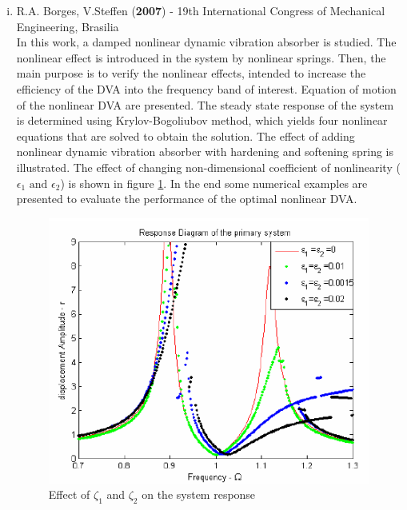 \begin{enumerate}[i)]
\item {R.A. Borges, V.Steffen (\textbf{2007}) - 19th International Congress of Mechanical Engineering, Brasilia}\\
In this work, a damped nonlinear dynamic
vibration absorber is studied. The nonlinear effect is introduced in the system by nonlinear springs. Then, the main purpose is to verify the nonlinear effects, intended to increase the efficiency of the DVA into the frequency band of interest. Equation of motion of the nonlinear DVA are presented. The steady state response of the system is determined using Krylov-Bogoliubov method, which yields four nonlinear equations that are solved to obtain the solution. The effect of adding nonlinear dynamic vibration absorber with hardening and softening spring is illustrated. The effect of changing non-dimensional coefficient of nonlinearity ($\epsilon_1 \text{ and } \epsilon_2$) is shown in figure \ref{borges}. In the end some numerical examples are presented to evaluate the performance of the optimal nonlinear DVA. 
\begin{figure}[h!]
\centering
\includegraphics[scale=1]{"figures/changeInZetaborges"}
\caption{Effect of $\zeta_1$ and $\zeta_2$ on the system response}
\label{borges}
\end{figure}


\end{enumerate}
